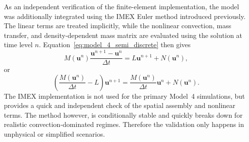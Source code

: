 As an independent verification of the finite-element implementation, the model was additionally integrated using the IMEX Euler method introduced previously. The linear terms are treated implicitly, while the nonlinear convection, mass transfer, and density-dependent mass matrix are evaluated using the solution at time level $n$. Equation~\eqref{eq:model_4_semi_discrete} then gives
\begin{equation}
M(\mathbf u^n)\frac{\mathbf u^{n+1}-\mathbf u^n}{\Delta t}
=L\mathbf u^{n+1}+N(\mathbf u^n),
\end{equation}
or
\begin{equation}\label{eq:model4_IMEX}
\left(\frac{M(\mathbf u^n)}{\Delta t}-L\right)\mathbf u^{n+1}
=\frac{M(\mathbf u^n)}{\Delta t}\mathbf u^n+N(\mathbf u^n).
\end{equation}
The IMEX implementation is not used for the primary Model~4 simulations, but provides a quick and independent check of the spatial assembly and nonlinear terms. The method however, is conditionally stable and quickly breaks down for realistic convection-dominated regimes. Therefore the validation only happens in unphysical or simplified scenarios.
